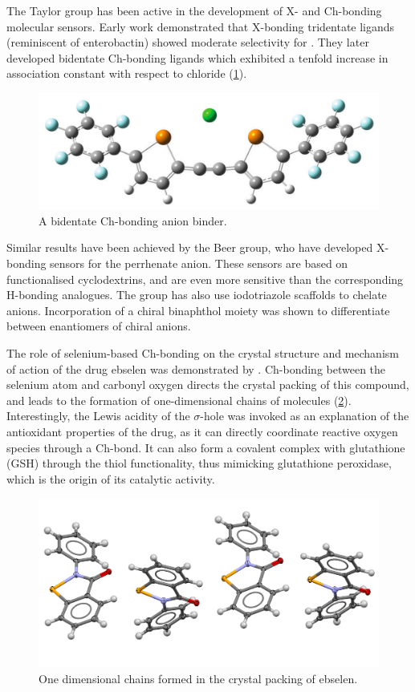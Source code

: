 \begin{refsection}
The Taylor group has been active in the development of X- and Ch-bonding molecular sensors.
Early work demonstrated that X-bonding tridentate ligands (reminiscent of enterobactin) showed moderate selectivity for .\autocite{Dimitrijevic2010}
They later developed bidentate Ch-bonding ligands which exhibited a tenfold increase in association constant with respect to chloride (\cref{fig:taylor-cl-binder}).\autocite{Garrett2015a,Garrett2016}

\begin{figure}
    \centering
    \includegraphics[width=0.6\linewidth]{Figures/taylor-cl-binder.pdf}
    \caption[A bidentate Ch-bonding anion binder.]{A bidentate Ch-bonding anion binder.\autocite{Garrett2016}}\label{fig:taylor-cl-binder}
\end{figure}

Similar results have been achieved by the Beer group, who have developed X-bonding sensors for the perrhenate anion.\autocite{Cornes2017}
These sensors are based on functionalised cyclodextrins, and are even more sensitive than the corresponding H-bonding analogues.
The group has also use iodotriazole scaffolds to chelate anions.\autocite{Borissov2017}
Incorporation of a chiral binaphthol moiety was shown to differentiate between enantiomers of chiral anions.

The role of selenium-based Ch-bonding on the crystal structure and mechanism of action of the drug ebselen was demonstrated by \citeauthor{Thomas2015}.\autocite{Thomas2015}
Ch-bonding between the selenium atom and carbonyl oxygen directs the crystal packing of this compound, and leads to the formation of one-dimensional chains of molecules (\cref{fig:ebs-packing}).
Interestingly, the Lewis acidity of the $ \sigma $-hole was invoked as an explanation of the antioxidant properties of the drug, as it can directly coordinate reactive oxygen species through a Ch-bond.
It can also form a covalent complex with glutathione (GSH) through the thiol functionality, thus mimicking glutathione peroxidase, which is the origin of its catalytic activity.\autocite{Azad2014}

\begin{figure}
    \centering
    \includegraphics[width=0.7\linewidth]{Figures/ebs-packing.pdf}
    \caption{One dimensional chains formed in the crystal packing of ebselen.}\label{fig:ebs-packing}
\end{figure}


\end{refsection}
